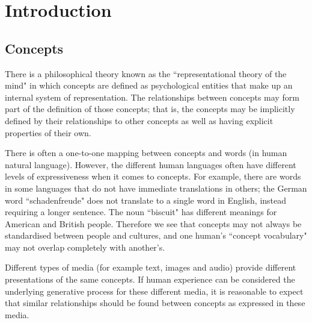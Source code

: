 \chapter{Introduction}

\section{Concepts}

There is a philosophical theory known as the ``representational theory of the mind" \cite{stanfordconcepts} in which concepts are defined as psychological entities that make up an internal system of representation. The relationships between concepts may form part of the definition of those concepts; that is, the concepts may be implicitly defined by their relationships to other concepts as well as having explicit properties of their own. 

There is often a one-to-one mapping between concepts and words (in human natural language). However, the different human languages often have different levels of expressiveness when it comes to concepts. For example, there are words in some languages that do not have immediate translations in others; the German word ``schadenfreude" does not translate to a single word in English, instead requiring a longer sentence. The noun ``biscuit" has different meanings for American and British people. Therefore we see that concepts may not always be standardised between people and cultures, and one human's ``concept vocabulary" may not overlap completely with another's. 

Different types of media (for example text, images and audio) provide different presentations of the same concepts. If human experience can be considered the underlying generative process for these different media, it is reasonable to expect that similar relationships should be found between concepts as expressed in these media. 


